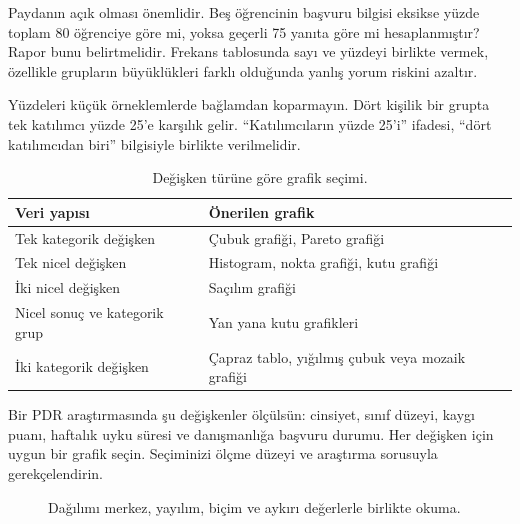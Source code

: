 Paydanın açık olması önemlidir. Beş öğrencinin başvuru bilgisi eksikse yüzde
toplam 80 öğrenciye göre mi, yoksa geçerli 75 yanıta göre mi hesaplanmıştır?
Rapor bunu belirtmelidir. Frekans tablosunda sayı ve yüzdeyi birlikte vermek,
özellikle grupların büyüklükleri farklı olduğunda yanlış yorum riskini azaltır.

\begin{mistakebox}
Yüzdeleri küçük örneklemlerde bağlamdan koparmayın. Dört kişilik bir grupta
tek katılımcı yüzde 25'e karşılık gelir. ``Katılımcıların yüzde 25'i'' ifadesi,
``dört katılımcıdan biri'' bilgisiyle birlikte verilmelidir.
\end{mistakebox}

\begin{table}[htbp]
\centering
\caption{Değişken türüne göre grafik seçimi.}
\begin{tabular}{p{}p{}}
\toprule
Veri yapısı & Önerilen grafik \\
\midrule
Tek kategorik değişken & Çubuk grafiği, Pareto grafiği \\
Tek nicel değişken & Histogram, nokta grafiği, kutu grafiği \\
İki nicel değişken & Saçılım grafiği \\
Nicel sonuç ve kategorik grup & Yan yana kutu grafikleri \\
İki kategorik değişken & Çapraz tablo, yığılmış çubuk veya mozaik grafiği \\
\bottomrule
\end{tabular}
\end{table}

\begin{etkinlik}
Bir PDR araştırmasında şu değişkenler ölçülsün: cinsiyet, sınıf düzeyi, kaygı
puanı, haftalık uyku süresi ve danışmanlığa başvuru durumu. Her değişken için
uygun bir grafik seçin. Seçiminizi ölçme düzeyi ve araştırma sorusuyla
gerekçelendirin.
\end{etkinlik}

\begin{figure}[htbp]
\centering
{}
\caption{Dağılımı merkez, yayılım, biçim ve aykırı değerlerle birlikte okuma.}
\end{figure}

